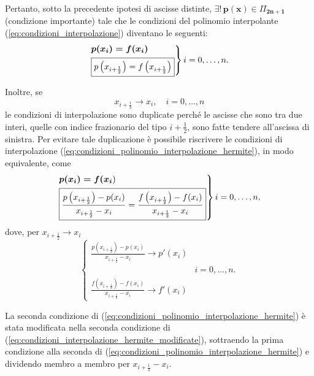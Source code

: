 Pertanto, sotto la precedente ipotesi di ascisse distinte, $\boldsymbol{\exists!\, p(x)}\in\Pi_{\boldsymbol{2n+1}}$ (condizione importante) tale che le condizioni del polinomio interpolante (\ref{eq:condizioni_interpolazione}) diventano le seguenti:
\begin{equation}\label{eq:condizioni_polinomio_interpolazione_hermite}
    \begin{rcases}
        \boldsymbol{p(x_i)=f(x_i)}\\
        \boxed{p\left(x_{i+\frac{1}{2}}\right)=f\left(x_{i+\frac{1}{2}}\right)}
    \end{rcases} i=0,\hdots,n.
\end{equation}

Inoltre, se
\begin{equation}\label{eq:x_i/2->x_i}
	x_{i+\frac{1}{2}}\rightarrow x_i,\quad  i=0,\hdots,n
\end{equation}
le condizioni di interpolazione sono duplicate perché le ascisse che sono tra due interi, quelle con indice frazionario del tipo $i+\frac{1}{2}$, sono fatte tendere all'ascissa di sinistra. Per evitare tale duplicazione è possibile riscrivere le condizioni di interpolazione (\ref{eq:condizioni_polinomio_interpolazione_hermite}), in modo equivalente, come
\begin{equation}\label{eq:condizioni_interpolazione_hermite_modificate}
    \begin{rcases}
        \boldsymbol{p(x_i)=f(x_i})\\
        \boxed{\frac{p\left(x_{i+\frac{1}{2}}\right)-p(x_i)}{x_{i+\frac{1}{2}}-x_i}=\frac{f\left(x_{i+\frac{1}{2}}\right)-f(x_i)}{x_{i+\frac{1}{2}}-x_i}}
     \end{rcases} i=0,\hdots,n,
\end{equation}
dove, per $x_{i+\frac{1}{2}}\rightarrow x_i$
\begin{equation*}
    \begin{cases}
        \frac{p\left(x_{i+\frac{1}{2}}\right)-p(x_i)}{x_{i+\frac{1}{2}}-x_i}\rightarrow p'(x_i)\\
        & i=0,\hdots, n.\\
        \frac{f\left(x_{i+\frac{1}{2}}\right)-f(x_i)}{x_{i+\frac{1}{2}}-x_i}\rightarrow f'(x_i)
    \end{cases}
\end{equation*}

\begin{remark}
    La seconda condizione di (\ref{eq:condizioni_polinomio_interpolazione_hermite}) è stata modificata nella seconda condizione di (\ref{eq:condizioni_interpolazione_hermite_modificate}), sottraendo la prima condizione alla seconda di (\ref{eq:condizioni_polinomio_interpolazione_hermite}) e dividendo membro a membro per $x_{i+\frac{1}{2}}-x_i$.
\end{remark}


